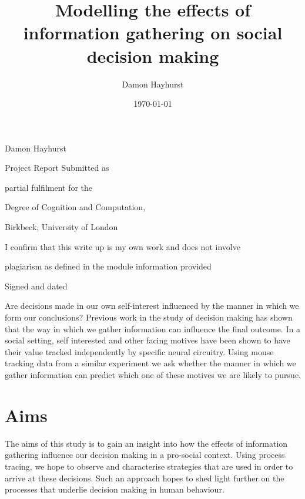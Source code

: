 \documentclass[man, floatsintext]{apa7}
\title{Modelling the effects of information gathering on social decision making}
\author{Damon Hayhurst}
\date{\today}
\makeatletter
\renewcommand{\maketitle}{
	\begin{titlepage}
		\centering
		\vspace*{0.4in}
		{\Huge \bfseries \@title \par}
		\vspace{0.2in}
		{\LARGE Damon Hayhurst \par}
		\vspace{0.3in}
		{\Large Project Report Submitted as\par}
		{\Large partial fulfilment for the\par}
		{\Large Degree of Cognition and Computation,\par}
		\vfill
		{\Large Birkbeck, University of London\par}
		{\Large \@date \par}
		\vfill
		{\Large
			\begin{center}
				I confirm that this write up is my own work and does not involve\par
				plagiarism as defined in the module information provided
			\end{center}
		}
		{\Large Signed and dated\par}
		\vspace{1in}
	\end{titlepage}
}
\makeatother
\begin{document}
\maketitle


\abstract







Are decisions made in our own self-interest influenced by the manner in which we form our conclusions? Previous work in the study of decision making has shown that the way in which we gather information can influence the final outcome. In a social setting, self interested and other facing motives have been shown to have their value tracked independently by specific neural circuitry. Using mouse tracking data from a similar experiment we ask whether the manner in which we gather information can predict which one of these motives we are likely to pursue. 

\section{Aims}

The aims of this study is to gain an insight into how the effects of information gathering influence our decision making in a pro-social context.  Using process tracing, we hope to observe and characterise strategies that are used in order to arrive at these decisions. Such an approach hopes to shed light further on the processes that underlie decision making in human behaviour.
\end{document}
